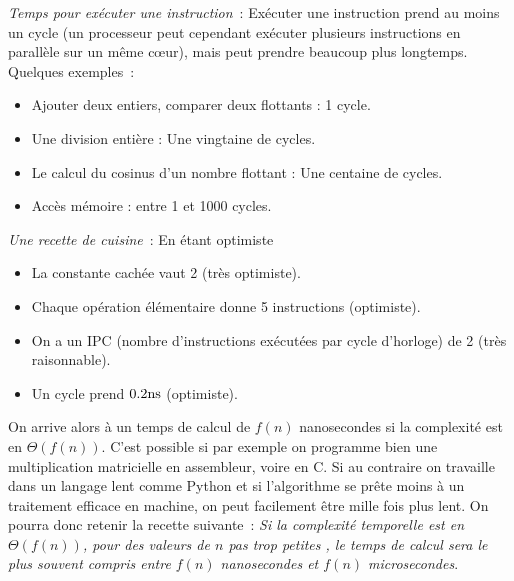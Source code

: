 \documentclass{magnolia}
\begin{document}
\emph{Temps pour exécuter une instruction}~: Exécuter une instruction prend
au moins un cycle (un processeur peut cependant exécuter plusieurs
  instructions en parallèle sur un même cœur), mais peut prendre
beaucoup plus longtemps. Quelques exemples~:
\begin{itemize}
  \item Ajouter deux entiers, comparer deux flottants : 1 cycle.
  \item Une division entière : Une vingtaine de cycles.
  \item Le calcul du cosinus d'un nombre flottant : Une centaine de cycles.
  \item Accès mémoire : entre 1 et 1000 cycles.
\end{itemize}
\vspace{2ex}

\noindent
\emph{Une recette de cuisine}~: En étant optimiste
\begin{itemize}
  \item La constante cachée vaut 2 (très optimiste).
  \item Chaque opération élémentaire donne 5 instructions (optimiste).
  \item On a un IPC (nombre d'instructions exécutées par cycle d'horloge) de 2 (très raisonnable).
  \item Un cycle prend $0.2{\rm ns}$ (optimiste).
\end{itemize}
On arrive alors à un temps de calcul de $f(n)$ nanosecondes si la complexité est
en $\Theta(f(n))$. C'est possible si par exemple on programme bien une
multiplication matricielle en assembleur, voire en C.
Si au contraire on travaille dans un langage \og lent \fg comme Python et si
l'algorithme se prête moins à un traitement efficace en machine, on peut
facilement être mille fois plus lent. On pourra donc retenir la recette
suivante~: \emph{Si la complexité temporelle est en $\Theta(f(n))$,
pour des valeurs de $n$ \og pas trop petites \fg, le temps de
  calcul sera le plus souvent compris entre $f(n)$ nanosecondes et
  $f(n)$ microsecondes}.
\end{document}

